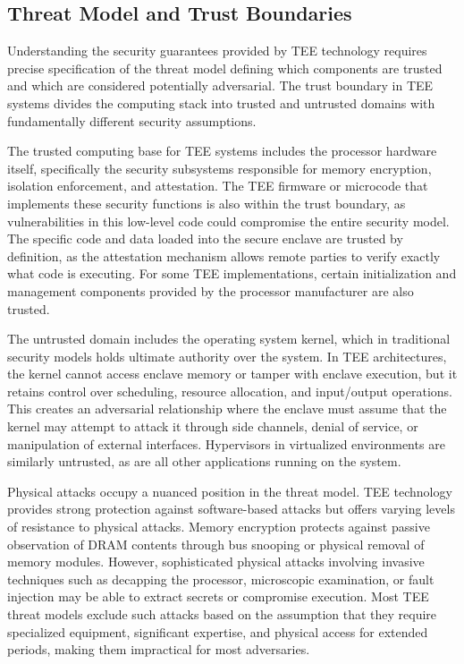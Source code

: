 \subsection{Threat Model and Trust Boundaries}

Understanding the security guarantees provided by TEE technology requires precise specification of the threat model defining which components are trusted and which are considered potentially adversarial. The trust boundary in TEE systems divides the computing stack into trusted and untrusted domains with fundamentally different security assumptions.

The trusted computing base for TEE systems includes the processor hardware itself, specifically the security subsystems responsible for memory encryption, isolation enforcement, and attestation. The TEE firmware or microcode that implements these security functions is also within the trust boundary, as vulnerabilities in this low-level code could compromise the entire security model. The specific code and data loaded into the secure enclave are trusted by definition, as the attestation mechanism allows remote parties to verify exactly what code is executing. For some TEE implementations, certain initialization and management components provided by the processor manufacturer are also trusted.

The untrusted domain includes the operating system kernel, which in traditional security models holds ultimate authority over the system. In TEE architectures, the kernel cannot access enclave memory or tamper with enclave execution, but it retains control over scheduling, resource allocation, and input/output operations. This creates an adversarial relationship where the enclave must assume that the kernel may attempt to attack it through side channels, denial of service, or manipulation of external interfaces. Hypervisors in virtualized environments are similarly untrusted, as are all other applications running on the system.

Physical attacks occupy a nuanced position in the threat model. TEE technology provides strong protection against software-based attacks but offers varying levels of resistance to physical attacks. Memory encryption protects against passive observation of DRAM contents through bus snooping or physical removal of memory modules. However, sophisticated physical attacks involving invasive techniques such as decapping the processor, microscopic examination, or fault injection may be able to extract secrets or compromise execution. Most TEE threat models exclude such attacks based on the assumption that they require specialized equipment, significant expertise, and physical access for extended periods, making them impractical for most adversaries.

